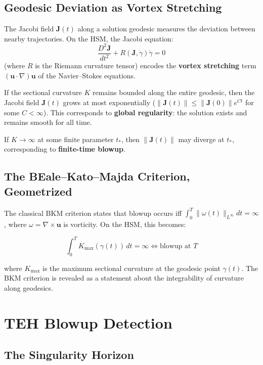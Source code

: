 \documentclass{article}
\begin{document}
\subsection{Geodesic Deviation as Vortex Stretching}

The Jacobi field $\mathbf{J}(t)$ along a solution geodesic measures the
deviation between nearby trajectories.  On the HSM, the Jacobi equation:
\begin{equation}
\frac{D^2\mathbf{J}}{dt^2} + R(\mathbf{J}, \dot{\gamma})\dot{\gamma} = 0
\end{equation}
(where $R$ is the Riemann curvature tensor) encodes the \textbf{vortex
stretching} term $(\mathbf{u} \cdot \nabla)\mathbf{u}$ of the Navier--Stokes
equations.

If the sectional curvature $K$ remains bounded along the entire geodesic,
then the Jacobi field $\mathbf{J}(t)$ grows at most exponentially
($\|\mathbf{J}(t)\| \leq \|\mathbf{J}(0)\| e^{Ct}$ for some $C < \infty$).
This corresponds to \textbf{global regularity}: the solution exists and
remains smooth for all time.

If $K \to \infty$ at some finite parameter $t_*$, then $\|\mathbf{J}(t)\|$
may diverge at $t_*$, corresponding to \textbf{finite-time blowup}.

\subsection{The BEale--Kato--Majda Criterion, Geometrized}

The classical BKM criterion states that blowup occurs iff
$\int_0^T \|\omega(t)\|_{L^\infty} dt = \infty$, where $\omega = \nabla \times
\mathbf{u}$ is vorticity.  On the HSM, this becomes:

\begin{equation}
\int_0^T K_{\max}(\gamma(t)) \, dt = \infty \iff \text{blowup at } T
\end{equation}

where $K_{\max}$ is the maximum sectional curvature at the geodesic point
$\gamma(t)$.  The BKM criterion is revealed as a statement about the
integrability of curvature along geodesics.

\section{TEH Blowup Detection}
\label{sec:teh-blowup}

\subsection{The Singularity Horizon}
\end{document}
